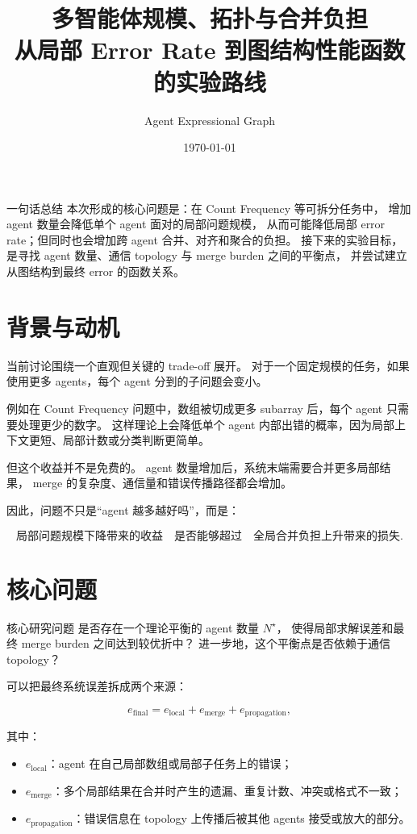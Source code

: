 \documentclass[UTF8,11pt,a4paper,fontset=fandol]{ctexart}
\title{\vspace{-1.8em}\textbf{\Huge 多智能体规模、拓扑与合并负担}\\[0.35em]
\Large 从局部 Error Rate 到图结构性能函数的实验路线}
\author{Agent Expressional Graph}
\date{\today}
\begin{document}
\maketitle

\begin{keybox}{一句话总结}
本次形成的核心问题是：在 Count Frequency 等可拆分任务中，
增加 agent 数量会降低单个 agent 面对的局部问题规模，
从而可能降低局部 error rate；但同时也会增加跨 agent 合并、对齐和聚合的负担。
接下来的实验目标，是寻找 agent 数量、通信 topology 与 merge burden 之间的平衡点，
并尝试建立从图结构到最终 error 的函数关系。
\end{keybox}

\section{背景与动机}

当前讨论围绕一个直观但关键的 trade-off 展开。
对于一个固定规模的任务，如果使用更多 agents，每个 agent 分到的子问题会变小。

例如在 Count Frequency 问题中，数组被切成更多 subarray 后，每个 agent 只需要处理更少的数字。
这样理论上会降低单个 agent 内部出错的概率，因为局部上下文更短、局部计数或分类判断更简单。

但这个收益并不是免费的。
agent 数量增加后，系统末端需要合并更多局部结果，
merge 的复杂度、通信量和错误传播路径都会增加。

因此，问题不只是“agent 越多越好吗”，而是：

\[
\textbf{局部问题规模下降带来的收益}
\quad \text{是否能够超过} \quad
\textbf{全局合并负担上升带来的损失}.
\]

\section{核心问题}

\begin{decisionbox}{核心研究问题}
是否存在一个理论平衡的 agent 数量 \(N^\star\)，
使得局部求解误差和最终 merge burden 之间达到较优折中？
进一步地，这个平衡点是否依赖于通信 topology？
\end{decisionbox}

可以把最终系统误差拆成两个来源：

\[
e_{\mathrm{final}}
=
e_{\mathrm{local}}
+
e_{\mathrm{merge}}
+
e_{\mathrm{propagation}},
\]

其中：

\begin{itemize}
  \item \(e_{\mathrm{local}}\)：agent 在自己局部数组或局部子任务上的错误；
  \item \(e_{\mathrm{merge}}\)：多个局部结果在合并时产生的遗漏、重复计数、冲突或格式不一致；
  \item \(e_{\mathrm{propagation}}\)：错误信息在 topology 上传播后被其他 agents 接受或放大的部分。
\end{itemize}
\end{document}
